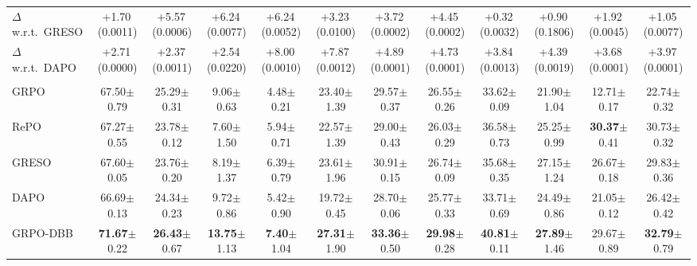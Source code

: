\begin{table}[t]
{\begin{tabular}{lcccccc>{\columncolor{AvgCol}}c|ccc>{\columncolor{AvgCol}}c}
    $\Delta$ w.r.t.\ GRESO
    & +1.70{\tiny\,(0.0011)} & +5.57{\tiny\,(0.0006)} & +6.24{\tiny\,(0.0077)} & +6.24{\tiny\,(0.0052)} & +3.23{\tiny\,(0.0100)} & +3.72{\tiny\,(0.0002)} & +4.45{\tiny\,(0.0002)}
    & +0.32{\tiny\,(0.0032)} & +0.90{\tiny\,(0.1806)} & +1.92{\tiny\,(0.0045)} & +1.05{\tiny\,(0.0077)} \\
    $\Delta$ w.r.t.\ DAPO
    & +2.71{\tiny\,(0.0000)} & +2.37{\tiny\,(0.0011)} & +2.54{\tiny\,(0.0220)} & +8.00{\tiny\,(0.0010)} & +7.87{\tiny\,(0.0012)} & +4.89{\tiny\,(0.0001)} & +4.73{\tiny\,(0.0001)}
    & +3.84{\tiny\,(0.0013)} & +4.39{\tiny\,(0.0019)} & +3.68{\tiny\,(0.0001)} & +3.97{\tiny\,(0.0001)} \\

    \midrule
    \rowcolor{ModelRow}
    \multicolumn{12}{c}{\textbf{Qwen3-1.7B-Base} trained with \textbf{DAPO-Math-17k}} \\
    \midrule
    GRPO
    & 67.50{\tiny$\pm$0.79} & 25.29{\tiny$\pm$0.31} & 9.06{\tiny$\pm$0.63} & 4.48{\tiny$\pm$0.21} & 23.40{\tiny$\pm$1.39} & 29.57{\tiny$\pm$0.37} & 26.55{\tiny$\pm$0.26}
    & 33.62{\tiny$\pm$0.09} & 21.90{\tiny$\pm$1.04} & 12.71{\tiny$\pm$0.17} & 22.74{\tiny$\pm$0.32} \\
    RePO
    & 67.27{\tiny$\pm$0.55} & 23.78{\tiny$\pm$0.12} & 7.60{\tiny$\pm$1.50} & 5.94{\tiny$\pm$0.71} & 22.57{\tiny$\pm$1.39} & 29.00{\tiny$\pm$0.43} & 26.03{\tiny$\pm$0.29}
    & 36.58{\tiny$\pm$0.73} & 25.25{\tiny$\pm$0.99} & \textbf{30.37}{\tiny$\pm$0.41} & 30.73{\tiny$\pm$0.32} \\
    GRESO
    & 67.60{\tiny$\pm$0.05} & 23.76{\tiny$\pm$0.20} & 8.19{\tiny$\pm$1.37} & 6.39{\tiny$\pm$0.79} & 23.61{\tiny$\pm$1.96} & 30.91{\tiny$\pm$0.15} & 26.74{\tiny$\pm$0.09}
    & 35.68{\tiny$\pm$0.35} & 27.15{\tiny$\pm$1.24} & 26.67{\tiny$\pm$0.18} & 29.83{\tiny$\pm$0.36} \\
    DAPO
    & 66.69{\tiny$\pm$0.13} & 24.34{\tiny$\pm$0.23} & 9.72{\tiny$\pm$0.86} & 5.42{\tiny$\pm$0.90} & 19.72{\tiny$\pm$0.45} & 28.70{\tiny$\pm$0.06} & 25.77{\tiny$\pm$0.33}
    & 33.71{\tiny$\pm$0.69} & 24.49{\tiny$\pm$0.86} & 21.05{\tiny$\pm$0.12} & 26.42{\tiny$\pm$0.42} \\
    \midrule
    GRPO-DBB
    & \textbf{71.67}{\tiny$\pm$0.22} & \textbf{26.43}{\tiny$\pm$0.67} & \textbf{13.75}{\tiny$\pm$1.13} & \textbf{7.40}{\tiny$\pm$1.04} & \textbf{27.31}{\tiny$\pm$1.90} & \textbf{33.36}{\tiny$\pm$0.50} & \textbf{29.98}{\tiny$\pm$0.28}
    & \textbf{40.81}{\tiny$\pm$0.11} & \textbf{27.89}{\tiny$\pm$1.46} & 29.67{\tiny$\pm$0.89} & \textbf{32.79}{\tiny$\pm$0.79} \\

\end{tabular}}
\end{table}
